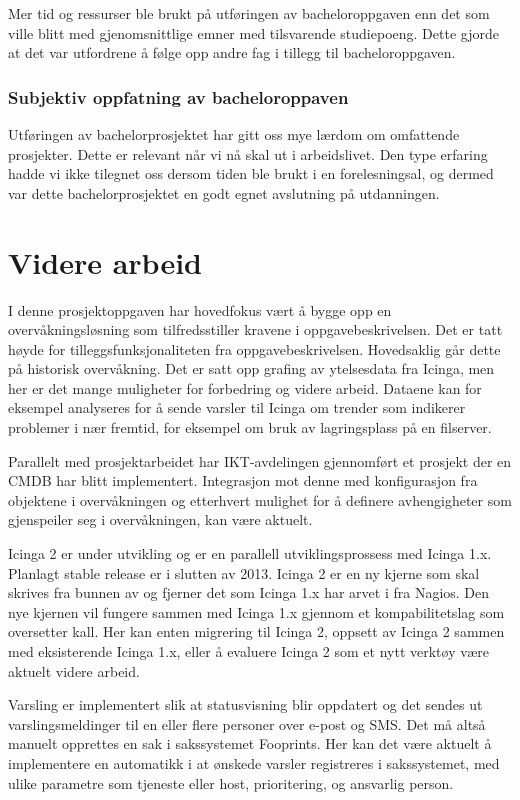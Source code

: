Mer tid og ressurser ble brukt på utføringen av bacheloroppgaven enn det som ville blitt med gjenomsnittlige emner med tilsvarende studiepoeng. Dette gjorde at det var utfordrene å følge opp andre fag i tillegg til bacheloroppgaven.

\subsubsection{Subjektiv oppfatning av bacheloroppaven}
Utføringen av bachelorprosjektet har gitt oss mye lærdom om omfattende prosjekter. Dette er relevant når vi nå skal ut i arbeidslivet. Den type erfaring hadde vi ikke tilegnet oss dersom tiden ble brukt i en forelesningsal, og dermed var dette bachelorprosjektet en godt egnet avslutning på utdanningen. 

\section{Videre arbeid}
I denne prosjektoppgaven har hovedfokus vært å bygge opp en overvåkningsløsning som tilfredsstiller kravene i oppgavebeskrivelsen. Det er tatt høyde for tilleggsfunksjonaliteten fra oppgavebeskrivelsen. Hovedsaklig går dette på historisk overvåkning. Det er satt opp grafing av ytelsesdata fra Icinga, men her er det mange muligheter for forbedring og videre arbeid. Dataene kan for eksempel analyseres for å sende varsler til Icinga om trender som indikerer problemer i nær fremtid, for eksempel om bruk av lagringsplass på en filserver.

Parallelt med prosjektarbeidet har IKT-avdelingen gjennomført et prosjekt der en CMDB har blitt implementert. Integrasjon mot denne med konfigurasjon fra objektene i overvåkningen og etterhvert mulighet for å definere avhengigheter som gjenspeiler seg i overvåkningen, kan være aktuelt.

Icinga 2\cite{icinga2} er under utvikling og er en parallell utviklingsprossess med Icinga 1.x. Planlagt stable release er i slutten av 2013. Icinga 2 er en ny kjerne som skal skrives fra bunnen av og fjerner det som Icinga 1.x har arvet i fra Nagios. Den nye kjernen vil fungere sammen med Icinga 1.x gjennom et kompabilitetslag\cite{wiki:comp} som oversetter kall. Her kan enten migrering til Icinga 2, oppsett av Icinga 2 sammen med eksisterende Icinga 1.x, eller å evaluere Icinga 2 som et nytt verktøy være aktuelt videre arbeid. 

Varsling er implementert slik at statusvisning blir oppdatert og det sendes ut varslingsmeldinger til en eller flere personer over e-post og SMS. Det må altså manuelt opprettes en sak i sakssystemet Fooprints. Her kan det være aktuelt å implementere en automatikk i at ønskede varsler registreres i sakssystemet, med ulike parametre som tjeneste eller host, prioritering, og ansvarlig person.

